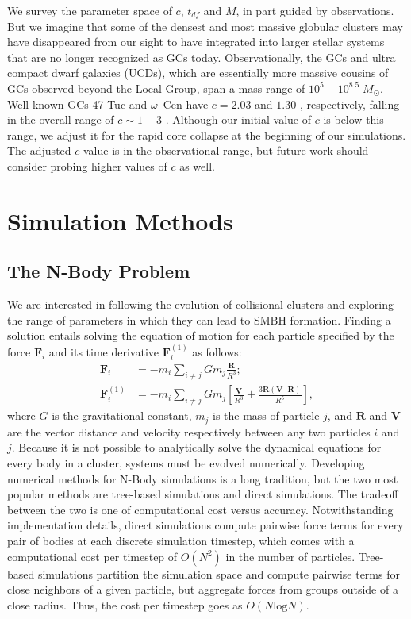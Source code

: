 \documentclass{princeton_astro_thesis}
\newcommand\msun{\; M_\odot}
\numberwithin{equation}{section}
\begin{document}
We survey the parameter space of $c$, $t_{df}$ and $M$, in part guided by observations.
But we imagine that some of the densest and most massive globular clusters may have disappeared from 
our sight to have integrated into larger stellar systems that are no longer recognized as GCs today.
Observationally, the GCs and ultra compact dwarf galaxies (UCDs), which are essentially more massive cousins
of GCs observed beyond the Local Group, span a mass range of $10^5-10^{8.5}\msun$.  
Well known GCs 47 Tuc and $\omega$~Cen have $c=2.03$ and $1.30$ \citep[][]{2000Carraro}, respectively,
falling in the overall range of $c\sim 1-3$ \citep[e.g.,][]{2007Evstigneeva}. Although our initial value of $c$ is below this range, we adjust it for the rapid core collapse at the beginning of our simulations. The adjusted $c$ value is in the observational range, but future work should consider probing higher values of $c$ as well. 

\chapter{Simulation Methods} \label{ch:Methods}

\section{The N-Body Problem}
We are interested in following the evolution of collisional clusters and exploring the range of parameters in which they can lead to \ac{SMBH} formation. Finding a solution entails solving the equation of motion for each particle specified by the force $\mathbf{F}_{i}$ and its time derivative $\mathbf{F}^{(1)}_{i}$ as follows:
\begin{subequations}
    \begin{align}
    \mathbf{F}_{i} &= -m_{i}\sum_{i \neq j} Gm_{j} \frac{\mathbf{R}}{R^3}; \\
    \mathbf{F}^{(1)}_{i} &=  -m_{i}\sum_{i \neq j} Gm_{j} \left[ \frac{\mathbf{V}}{R^3} + \frac{3\mathbf{R}(\mathbf{V} \cdot \mathbf{R})}{R^5}\right],
    \end{align}
    \label{eqn:gravmotion}
\end{subequations}
where $G$ is the gravitational constant, $m_j$ is the mass of particle $j$, and $\mathbf{R}$ and $\mathbf{V}$ are the vector distance and velocity respectively between any two particles $i$ and $j$.  Because it is not possible to analytically solve the dynamical equations for every body in a cluster, systems must be evolved numerically. Developing numerical methods for N-Body simulations is a long tradition, but the two most popular methods are tree-based simulations and direct simulations. The tradeoff between the two is one of computational cost versus accuracy. Notwithstanding implementation details, direct simulations compute pairwise force terms for every pair of bodies at each discrete simulation timestep, which comes with a computational cost per timestep of $O(N^2)$ in the number of particles.  Tree-based simulations partition the simulation space and compute pairwise terms for close neighbors of a given particle, but aggregate forces from groups outside of a close radius. Thus, the cost per timestep goes as $O(N\mathrm{log}N)$.
\end{document}
